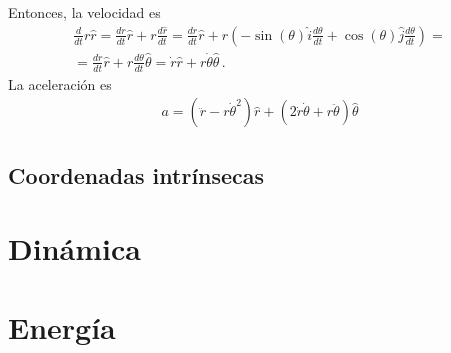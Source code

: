 \documentclass{article}
\begin{document}
Entonces, la velocidad es
\begin{multline}
	\frac{d}{dt} r\hat{r} = \frac{dr}{dt}\hat{r} + r\frac{d\hat{r}}{dt} = 
	\frac{dr}{dt}\hat{r} + r\left(-\sin (\theta) \hat{i}\frac{d\theta}{dt} + 
	\cos(\theta) \hat{j}\frac{d\theta}{dt}\right) =\\
	= \frac{dr}{dt}\hat{r} + r\frac{d\theta}{dt}\hat{\theta} = \dot{r}\hat{r} + 
	r\dot{\theta}\hat{\theta}\,.
\end{multline}
La aceleración es
\begin{multline}
	a = (\ddot{r}-r\dot{\theta}^2)\hat{r} + (2\dot{r}\dot{\theta} + 
	r\ddot{\theta})\hat{\theta} 
\end{multline}

\subsection{Coordenadas intrínsecas}

\section{Dinámica}

\section{Energía}
\end{document}
